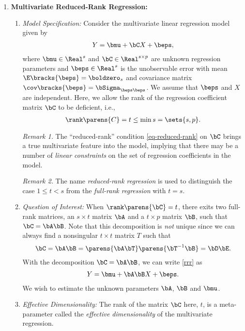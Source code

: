 \documentclass[12pt]{article}
\begin{document}
\begin{enumerate}[label=\textbf{\arabic*.}]
	\item \textbf{Multivariate Reduced-Rank Regression:} 
	\begin{enumerate}
		\item \textit{Model Specification:} Consider the multivariate linear regression model given by 
		\begin{align}\label{rrr}
		Y = \bmu + \bC X + \beps, 
		\end{align}
		where $\bmu \in \Real^{s}$ and $\bC \in \Real^{s \times p}$ are unknown regression parameters and $\beps \in \Real^{s}$ is the unobservable error with mean $\E \bracks{\beps} = \boldzero_{s}$ and covariance matrix $\cov \bracks{\beps} = \bSigma_{\beps \beps}$. We assume that $\beps$ and $X$ are independent. Here, we allow the rank of the regression coefficient matrix $\bC$ to be deficient, i.e., 
		\begin{align}\label{eq-reduced-rank}
			\rank \parens{C} = t \le \min s = \sets{s, p}. 
		\end{align}
		
		\textit{Remark 1.} The ``reduced-rank'' condition \eqref{eq-reduced-rank} on $\bC$ brings a true multivariate feature into the model, implying that there may be a number of \emph{linear constraints} on the set of regression coefficients in the model. 
		
		\textit{Remark 2.} The name \textit{reduced-rank regression} is used to distinguish the case $1 \le t < s$ from the \textit{full-rank regression} with $t = s$. 
		
		\item \textit{Question of Interest:} When $\rank \parens{\bC} = t$, there exits two full-rank matrices, an $s \times t$ matrix $\bA$ and a $t \times p$ matrix $\bB$, such that $\bC = \bA \bB$. Note that this decomposition is \emph{not} unique since we can always find a nonsingular $t \times t$ matrix $T$ such that 
		\begin{align*}
			\bC = \bA \bB = \parens{\bA \bT} \parens{\bT^{-1} \bB} = \bD \bE. 
		\end{align*}
		With the decomposition $\bC = \bA \bB$, we can write \eqref{rrr} as 
		\begin{align*}
			Y = \bmu + \bA \bB X + \beps. 
		\end{align*}
		We wish to estimate the unknown parameters $\bA$, $\bB$ and $\bmu$. 
		
		\item \textit{Effective Dimensionality:} The rank of the matrix $\bC$ here, $t$, is a meta-parameter called the \textit{effective dimensionality} of the multivariate regression. 
		

\end{enumerate}
\end{enumerate}
\end{document}
